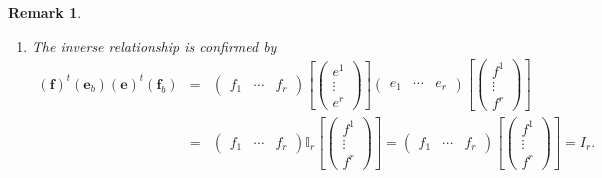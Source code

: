 \documentclass[aps,preprint]{revtex4}
\newtheorem{remark}[theorem]{Remark}
\begin{document}
\begin{remark}
\begin{enumerate}
\item The inverse relationship is confirmed by 
\begin{eqnarray}
\left( \boldsymbol{f}\right) ^{t}\left( \boldsymbol{e}_{b}\right) \left( 
\boldsymbol{e}\right) ^{t}\left( \boldsymbol{f}_{b}\right) &=&\left( 
\begin{array}{ccc}
f_{1} & \cdots & f_{r}%
\end{array}%
\right) \left[ \left( 
\begin{array}{c}
e^{1} \\ 
\vdots \\ 
e^{r}%
\end{array}%
\right) \right] \left( 
\begin{array}{ccc}
e_{1} & \cdots & e_{r}%
\end{array}%
\right) \left[ \left( 
\begin{array}{c}
f^{1} \\ 
\vdots \\ 
f^{r}%
\end{array}%
\right) \right] \\
&=&\left( 
\begin{array}{ccc}
f_{1} & \cdots & f_{r}%
\end{array}%
\right) \mathbb{I}_{r}\left[ \left( 
\begin{array}{c}
f^{1} \\ 
\vdots \\ 
f^{r}%
\end{array}%
\right) \right] =\left( 
\begin{array}{ccc}
f_{1} & \cdots & f_{r}%
\end{array}%
\right) \left[ \left( 
\begin{array}{c}
f^{1} \\ 
\vdots \\ 
f^{r}%
\end{array}%
\right) \right] =I_{r}.
\end{eqnarray}
\end{enumerate}
\end{remark}
\end{document}
